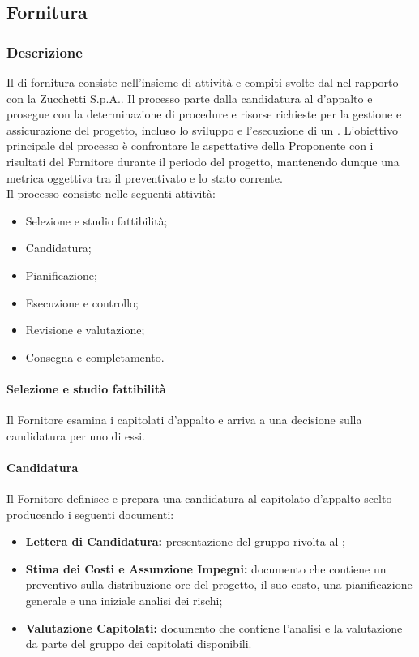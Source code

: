 \subsection{Fornitura}\label{fornitura}

\subsubsection{Descrizione}
Il  di fornitura consiste nell'insieme di attività e compiti svolte dal  nel rapporto con la  Zucchetti S.p.A.. Il processo parte dalla candidatura al  d'appalto e prosegue con la determinazione di procedure e risorse richieste per la gestione e assicurazione del progetto, incluso lo sviluppo e l'esecuzione di un .
L'obiettivo principale del processo è confrontare le aspettative della Proponente con i risultati del Fornitore durante il periodo del progetto, mantenendo dunque una metrica oggettiva tra il preventivato e lo stato corrente.\\
Il processo consiste nelle seguenti attività:
\begin{itemize}
  \item Selezione e studio fattibilità;
  \item Candidatura;
  \item Pianificazione;
  \item Esecuzione e controllo;
  \item Revisione e valutazione;
  \item Consegna e completamento.
\end{itemize}

\paragraph{Selezione e studio fattibilità}
Il Fornitore esamina i capitolati d'appalto e arriva a una decisione sulla candidatura per uno di essi.

\paragraph{Candidatura}
Il Fornitore definisce e prepara una candidatura al capitolato d'appalto scelto producendo i seguenti documenti:
\begin{itemize}
  \item \textbf{Lettera di Candidatura:} presentazione del gruppo rivolta al ;
  \item \textbf{Stima dei Costi e Assunzione Impegni:} documento che contiene un preventivo sulla distribuzione ore del progetto, il suo costo, una pianificazione generale e una iniziale analisi dei rischi;
  \item \textbf{Valutazione Capitolati:} documento che contiene l'analisi e la valutazione da parte del gruppo dei capitolati disponibili.
\end{itemize}

